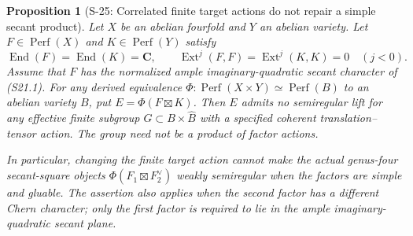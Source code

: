 \documentclass[11pt,a4paper]{article}
\newtheorem{proposition}[theorem]{Proposition}
\theoremstyle{definition}
\begin{document}
\begin{proposition}[S-25: Correlated finite target actions do not repair a simple secant product]
\label{prop:semireg-correlated-products}
Let $X$ be an abelian fourfold and $Y$ an abelian variety.
Let $F\in\operatorname{Perf}(X)$ and
$K\in\operatorname{Perf}(Y)$ satisfy
\[
 \operatorname{End}(F)=\operatorname{End}(K)=\mathbf C,
 \qquad \operatorname{Ext}^{j}(F,F)=
        \operatorname{Ext}^{j}(K,K)=0\quad(j<0).
 \tag{S25.1}
\]
Assume that $F$ has the normalized ample
imaginary-quadratic secant character of (S21.1).
For any derived equivalence
$\Phi:\operatorname{Perf}(X\times Y)\simeq
\operatorname{Perf}(B)$ to an abelian variety $B$, put
$E=\Phi(F\boxtimes K)$.
Then $E$ admits no semiregular lift for any effective
finite subgroup $G\subset B\times\widehat B$ with a
specified coherent translation--tensor action.
The group need not be a product of factor actions.

In particular, changing the finite target action cannot
make the actual genus-four secant-square objects
$\Phi(F_1\boxtimes F_2^\vee)$ weakly semiregular when the
factors are simple and gluable. The assertion also applies
when the second factor has a different Chern character;
only the first factor is required to lie in the ample
imaginary-quadratic secant plane.
\end{proposition}
\end{document}
